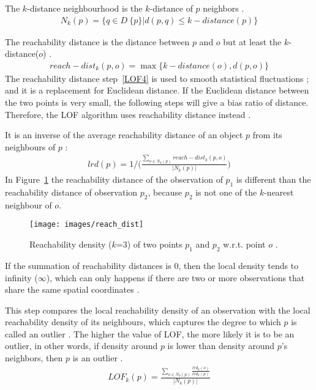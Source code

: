 \begin{defn} \label{LOF3} The $k$-distance neighbourhood is the $k$-distance of $p$ neighbors \citep{Markus}.
\begin{align}
\label{b}
N_{k}(p) = \lbrace q \in D \ \{p\} | d(p,q) \leq k-distance(p) \rbrace
\end{align}
\end{defn}

\begin{defn} \label{LOF4} The reachability distance is the distance between $p$ and $o$ but at least the $k$-distance($o$) \citep{LOF}.
\begin{align}
\label{c}
reach-dist_k(p,o) = \max \lbrace k-distance(o),d(p,o) \rbrace
\end{align}
The reachability distance step~\ref{LOF4} is used to smooth statistical fluctuations \citep{Markus}; and it is a replacement for Euclidean distance. If the Euclidean distance between the two points is very small, the following steps will give a bias ratio of distance. Therefore, the LOF algorithm uses reachability distance instead \citep{Mathew}. 
\end{defn}

\begin{defn} \label{LOF5} It is an inverse of the average reachability distance of an object $p$ from its neighbours of $p$ \citep{LOF}:
\begin{align}
\label{d}
lrd(p) = 1/ \bigg( \frac{\sum_{o \in N_{k}(p)} reach-dist_{k}(p,o)}{|N_{k}(p)|} \bigg)  
\end{align}
In Figure~\ref{reach_dist} the reachability distance of the observation of $p_1$ is different than the reachability distance of observation $p_2$, because $p_2$ is not one of the $k$-nearest neighbour of $o$.
\begin{figure}[!h]
\centering 
\texttt{[image: images/reach\_dist]}
\caption{Reachability density ($k$=3) of two points $p_1$ and $p_2$ w.r.t. point $o$ \citep{LOF}.}
\label{reach_dist} 
\end{figure}
\end{defn} 
If the summation of reachability distances is 0, then the local density tends to infinity ($\infty$), which can only happens if there are two or more observations that share the same spatial coordinates \citep{Markus}.

\begin{defn} \label{LOF6}
This step compares the local reachability density of an observation with the local reachability density of its neighbours, which captures the degree to which $p$ is called an outlier \citep{Hongyin}. The higher the value of LOF, the more likely it is to be an outlier, in other words, if density around $p$ is lower than density around $p$’s neighbors, then $p$ is an outlier \citep{Markus}.
\begin{align}
\label{e}
LOF_{k}(p) = \frac{\sum_{o \in N_{k}(p)}\frac{lrd_{k}(o)}{lrd_{k}(p)}} {|N_{k}(p)|}
\end{align}
\end{defn}

